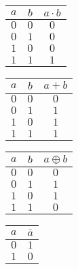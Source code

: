 \begin{Row}
	\begin{Cell}{1}
		\centering
		\begin{tabular}{cc|c}
			\toprule
			$a$ & $b$ & $a\cdot b$ \\
			\midrule
			$0$ & $0$ & $0$        \\
			$0$ & $1$ & $0$        \\
			$1$ & $0$ & $0$        \\
			$1$ & $1$ & $1$        \\
			\bottomrule
		\end{tabular}
	\end{Cell}
	\begin{Cell}{1}
		\centering
		\begin{tabular}{cc|c}
			\toprule
			$a$ & $b$ & $a+b$ \\
			\midrule
			$0$ & $0$ & $0$   \\
			$0$ & $1$ & $1$   \\
			$1$ & $0$ & $1$   \\
			$1$ & $1$ & $1$   \\
			\bottomrule
		\end{tabular}
	\end{Cell}
	\begin{Cell}{1}
		\centering
		\begin{tabular}{cc|c}
			\toprule
			$a$ & $b$ & $a \oplus b$ \\
			\midrule
			$0$ & $0$ & $0$          \\
			$0$ & $1$ & $1$          \\
			$1$ & $0$ & $1$          \\
			$1$ & $1$ & $0$          \\
			\bottomrule
		\end{tabular}
	\end{Cell}
	\begin{Cell}{1}
		\centering
		\begin{tabular}{c|c}
			\toprule
			$a$ & $\overline{a}$ \\
			\midrule
			$0$ & $1$            \\
			$1$ & $0$            \\
			\bottomrule
		\end{tabular}
	\end{Cell}
\end{Row}

\vspace{1em}

